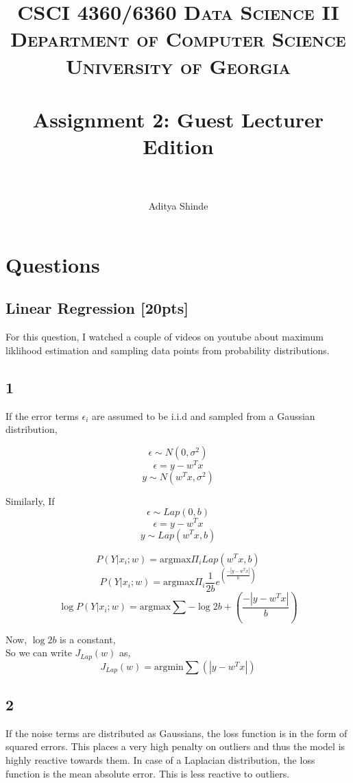 \documentclass[paper=a4, fontsize=11pt]{scrartcl} %
\title{	
\normalfont \normalsize 
\textsc{CSCI 4360/6360 Data Science II} \\
\textsc{Department of Computer Science} \\
\textsc{University of Georgia} \\ [15pt] %
\horrule{0.5pt} \\[0.3cm] %
\huge Assignment 2: Guest Lecturer Edition \\ %
\horrule{2pt} \\[0.4cm] %
}
\author{Aditya Shinde} %
\numberwithin{figure}{section} %
\numberwithin{table}{section} %
\begin{document}
\maketitle %



\section*{Questions}
\setcounter{subsection}{0}

\subsection{Linear Regression \textbf{[20pts]}}
For this question, I watched a couple of videos on youtube about maximum liklihood estimation and sampling data points from probability distributions. \\

\subsection*{1}
If the error terms $\epsilon_{i}$ are assumed to be i.i.d and sampled from a Gaussian distribution,

$$\epsilon \sim N(0,\sigma^{2})$$
$$\epsilon=y-w^{T}x$$
$$ y \sim N(w^{T}x,\sigma^{2})$$

Similarly, If\\

$$\epsilon \sim Lap(0,b)$$
$$\epsilon=y-w^{T}x$$
$$ y \sim Lap(w^{T}x,b)$$

$$P(Y|x_{i};w)=\textrm{argmax}\Pi_{i} Lap(w^{T}x,b)$$
$$P(Y|x_{i};w)=\textrm{argmax}\Pi_{i} \frac{1}{2b} e^{(\frac{-|y-w^{T}x|}{b})}$$
$$\log P(Y|x_{i};w)=\textrm{argmax}\sum -\log 2b+\left( \frac{-|y-w^{T}x|}{b}\right)$$

Now, $\log 2b$ is a constant, \\
So we can write $J_{Lap}(w)$ as,\\

$$J_{Lap}(w)=\textrm{argmin}\sum \left( |y-w^{T}x|\right)$$

\subsection*{2}

If the noise terms are distributed as Gaussians, the loss function is in the form of squared errors. This places a very high penalty on outliers and thus the model is highly reactive towards them. In case of a Laplacian distribution, the loss function is the mean absolute error. This is less reactive to outliers. 
\end{document}
